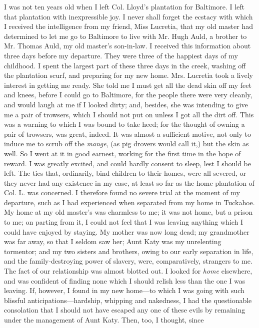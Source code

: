 I was not ten years old when I left Col. Lloyd's plantation for
Baltimore. I left that plantation with inexpressible joy. I never shall
forget the ecstacy with which I received the intelligence from my
friend, Miss Lucretia, that my old master had determined to let me go to
Baltimore to live with Mr. Hugh Auld, a brother to Mr. Thomas Auld, my
old master's son-in-law. I received this information about three days
before my departure. They were three of the happiest days of my
childhood. I spent the largest part of these three days in the creek,
washing off the plantation scurf, and preparing for my new home. Mrs.
Lucretia took a lively interest in getting me ready. She told me I must
get all the dead skin off my feet and knees, before I could go to
Baltimore, for the people there were very cleanly, and would laugh at me
if I looked dirty; and, besides, she was intending to give me a pair of
trowsers, which I should not put on unless I got all the dirt off. This
was a warning to which I was bound to take heed; for the thought of
owning a pair of trowsers, was great, indeed. It was almost a sufficient
motive, not only to induce me to scrub off the \emph{mange}, (as pig
drovers would call it,) but the skin as well. So I went at it in good
earnest, working for the first time in the hope of reward. I was greatly
excited, and could hardly consent to sleep, lest I should be left. The
ties that, ordinarily, bind children to their homes, were all severed,
or they never had any existence in {}my case, at least so far as the
home plantation of Col. L. was concerned. I therefore found no severe
trial at the moment of my departure, such as I had experienced when
separated from my home in Tuckahoe. My home at my old master's was
charmless to me; it was not home, but a prison to me; on parting from
it, I could not feel that I was leaving anything which I could have
enjoyed by staying. My mother was now long dead; my grandmother was far
away, so that I seldom saw her; Aunt Katy was my unrelenting tormentor;
and my two sisters and brothers, owing to our early separation in life,
and the family-destroying power of slavery, were, comparatively,
strangers to me. The fact of our relationship was almost blotted out. I
looked for \emph{home} elsewhere, and was confident of finding none
which I should relish less than the one I was leaving. If, however, I
found in my new home---to which I was going with such blissful
anticipations---hardship, whipping and nakedness, I had the questionable
consolation that I should not have escaped any one of these evils by
remaining under the management of Aunt Katy. Then, too, I thought, since
